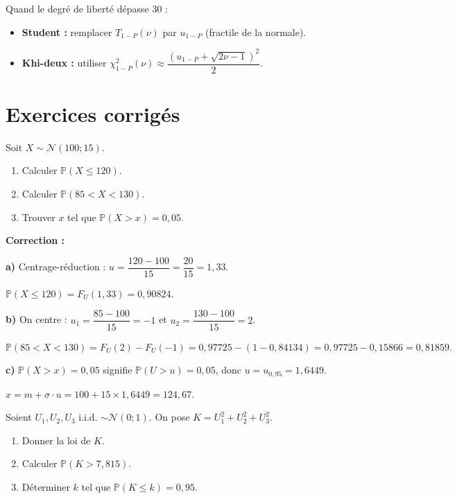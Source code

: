 \documentclass[11pt,a4paper]{article}
\newcommand{\N}{\mathcal{N}}
\newcommand{\Prob}{\mathbb{P}}
\renewcommand{\P}{\Prob}
\begin{document}
\begin{methbox}
Quand le degr\'e de libert\'e d\'epasse 30 :
\begin{itemize}
\item \textbf{Student :} remplacer $T_{1-P}(\nu)$ par $u_{1-P}$ (fractile de la normale).
\item \textbf{Khi-deux :} utiliser $\chi^2_{1-P}(\nu) \approx \dfrac{(u_{1-P} + \sqrt{2\nu-1})^2}{2}$.
\end{itemize}
\end{methbox}

\newpage
\section{Exercices corrig\'es}

\begin{thmbox}
Soit $X \sim \N(100;15)$.
\begin{enumerate}[label=\alph*)]
\item Calculer $\P(X \leq 120)$.
\item Calculer $\P(85 < X < 130)$.
\item Trouver $x$ tel que $\P(X > x) = 0{,}05$.
\end{enumerate}
\end{thmbox}

\textbf{Correction :}

\textbf{a)} Centrage-r\'eduction : $u = \dfrac{120-100}{15} = \dfrac{20}{15} = 1{,}33$.

$\P(X \leq 120) = F_U(1{,}33) = 0{,}90824.$

\medskip
\textbf{b)} On centre : $u_1 = \dfrac{85-100}{15} = -1$ et $u_2 = \dfrac{130-100}{15} = 2$.

$\P(85 < X < 130) = F_U(2) - F_U(-1) = 0{,}97725 - (1-0{,}84134) = 0{,}97725 - 0{,}15866 = 0{,}81859.$

\medskip
\textbf{c)} $\P(X > x) = 0{,}05$ signifie $\P(U > u) = 0{,}05$, donc $u = u_{0{,}95} = 1{,}6449$.

$x = m + \sigma \cdot u = 100 + 15 \times 1{,}6449 = 124{,}67.$

\bigskip
\begin{thmbox}
Soient $U_1, U_2, U_3$ i.i.d. $\sim \N(0;1)$. On pose $K = U_1^2 + U_2^2 + U_3^2$.
\begin{enumerate}[label=\alph*)]
\item Donner la loi de $K$.
\item Calculer $\P(K > 7{,}815)$.
\item D\'eterminer $k$ tel que $\P(K \leq k) = 0{,}95$.
\end{enumerate}
\end{thmbox}
\end{document}
